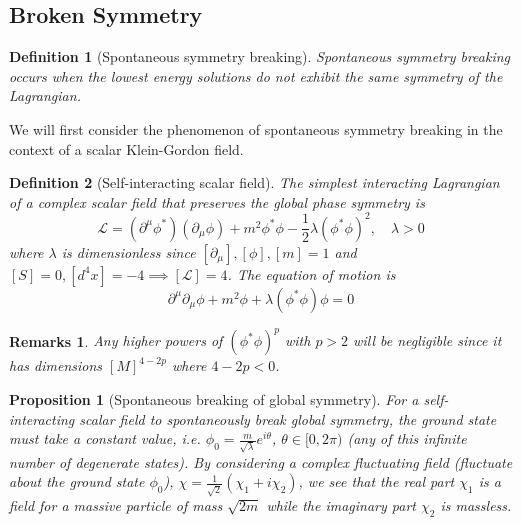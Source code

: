 \documentclass[a4paper]{article}
\newtheorem{remarks}{Remarks}[section]
\theoremstyle{new}
\newtheorem{defi}{Definition}[section]
\newtheorem{prop}{Proposition}[section]
\begin{document}
\subsection{Broken Symmetry}
\begin{defi}[Spontaneous symmetry breaking]
Spontaneous symmetry breaking occurs when the lowest energy solutions do not exhibit the same symmetry of the Lagrangian. 
\end{defi}
We will first consider the phenomenon of spontaneous symmetry breaking in the context of a scalar Klein-Gordon field.
\begin{defi}[Self-interacting scalar field]
The simplest interacting Lagrangian of a complex scalar field that preserves the global phase symmetry is
$$\mathcal{L}=(\partial^\mu\phi^*)(\partial_\mu\phi)+m^2\phi^*\phi-\frac{1}{2}\lambda(\phi^*\phi)^2,\quad\lambda>0$$
where $\lambda$ is dimensionless since $[\partial_\mu],[\phi],[m]=1$ and $[S]=0,[d^4x]=-4\implies[\mathcal{L}]=4$. The equation of motion is 
$$\partial^\mu\partial_\mu\phi+m^2\phi+\lambda(\phi^*\phi)\phi=0$$
\end{defi}
\begin{remarks}
Any higher powers of $(\phi^*\phi)^p$ with $p>2$ will be negligible since it has dimensions $[M]^{4-2p}$ where $4-2p<0$.
\end{remarks}
\begin{prop}[Spontaneous breaking of global symmetry]
For a self-interacting scalar field to spontaneously break global symmetry, the ground state must take a constant value, i.e. $\phi_0=\frac{m}{\sqrt{\lambda}}e^{i\theta}$, $\theta\in[0,2\pi)$ (any of this infinite number of degenerate states). By considering a complex fluctuating field (fluctuate about the ground state $\phi_0$), $\chi=\frac{1}{\sqrt{2}}(\chi_1+i\chi_2)$, we see that the real part $\chi_1$ is a field for a massive particle of mass $\sqrt{2m}$ while the imaginary part $\chi_2$ is massless.
\end{prop}
\end{document}
